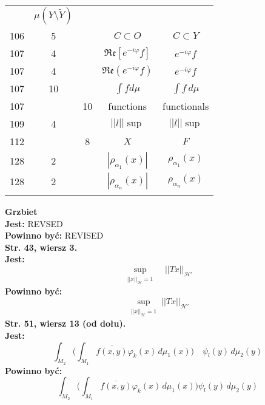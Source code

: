 \documentclass[a4paper,11pt]{article}
\newcommand{\ol}{\overline}
\newcommand{\wt}{\widetilde}
\newcommand{\mc}{\mathcal}
\newcommand{\mf}{\mathfrak}
\newcommand{\al}{\alpha}
\newcommand{\vp}{\varphi}
\newcommand{\Hc}{\mc{H}}
\newcommand{\sset}{\subset}
\newcommand{\setm}{\setminus}
\newcommand{\Real}{\mf{Re}}
\newcommand{\Int}{\int\limits}
\newcommand{\IntCaD}[2] { \Int #1 \, d#2 } %
\newcommand{\norm}[1]{\left|\left| #1 \right|\right|}
\newcommand{\tb}{\textbf}
\newcommand{\noi}{\noindent}
\newcommand{\StrWg}[2]{\tb{Str. #1, wiersz #2.}}
\newcommand{\StrWd}[2]{\tb{Str. #1, wiersz #2 (od dołu).}}
\newcommand{\Jest}{\tb{Jest: }}
\newcommand{\Pow}{\tb{Powinno być: }}
\begin{document}
\begin{center}
\begin{tabular}{|c|c|c|c|c|}
           & $\mu( Y \setm \wt{ Y } )$ \\
    106 & 5 & & $C \sset O$ & $C \sset Y$ \\
    107 & 4 & & $\Real[ e^{ -i \vp } f ]$ & $e^{ -i \vp } f$ \\
    107 & 4 & & $\Real( e^{ -i \vp } f )$ & $e^{ -i \vp } f$ \\
    107 & 10 & & $\int\! fd\mu$ & $\IntCaD{ f }{ \mu }$ \\
    107 & & 10 & functions & functionals \\
    109 & 4 & & $\norm{ l }\!\sup$ & $\norm{ l } \sup$ \\
    112 & & 8 & $X$ & $F$ \\
    128 & 2 & & $| \rho_{ \al_{ 1 } }( x ) |$ & $\rho_{ \al_{ 1 } }( x )$ \\
    128 & 2 & & $| \rho_{ \al_{ n } }( x ) |$ & $\rho_{ \al_{ n } }( x )$ \\
    & & & & \\ \hline
  \end{tabular}
\end{center}
\noi
\tb{Grzbiet} \\
\Jest REVSED \\
\Pow REVISED \\
\StrWg{43}{3} \\
\Jest
\begin{equation*}
  \sup_{ \substack{ \norm{ x }_{ \Hc } = 1 } } \;\;\; \norm{ T x }_{ \Hc' }
\end{equation*}
\Pow
\begin{equation*}
  \sup_{ \substack{ \norm{ x }_{ \Hc } = 1 } } \norm{ T x }_{ \Hc' }
\end{equation*}
\StrWd{51}{13} \\
\Jest
\begin{equation*}
  \int_{ M_{ 2 } } \bigg( \int_{ M_{ 1 } } \ol{ f( x, y ) } \vp_{ k }( x ) \,
  d\mu_{ 1 }( x ) \bigg) \quad \psi_{ l }( y ) \, d\mu_{ 2 }( y )
\end{equation*}
\Pow
\begin{equation*}
  \int_{ M_{ 2 } } \bigg( \int_{ M_{ 1 } } \ol{ f( x, y ) } \vp_{ k }( x ) \,
  d\mu_{ 1 }( x ) \bigg) \psi_{ l }( y ) \, d\mu_{ 2 }( y )
\end{equation*}



 {}
\end{document}
